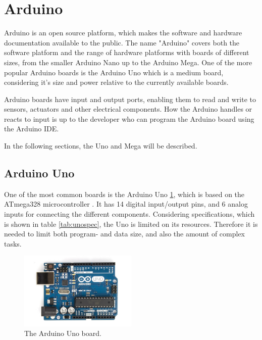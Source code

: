 \section{Arduino}\label{sec:arduino}
Arduino is an open source platform, which makes the software and hardware documentation available to the public. The name "Arduino" covers both the software platform and the range of hardware platforms with boards of different sizes, from the smaller Arduino Nano up to the Arduino Mega. One of the more popular Arduino boards is the Arduino Uno which is a medium board, considering it's size and power relative to the currently available boards.

Arduino boards have input and output ports, enabling them to read and write to sensors, actuators and other electrical components. How the Arduino handles or reacts to input is up to the developer who can program the Arduino board using the Arduino IDE.

In the following sections, the Uno and Mega will be described.

\subsection{Arduino Uno}
One of the most common boards is the Arduino Uno \ref{fig:arduinouno}, which is based on the ATmega328 microcontroller \cite{arduinouno}. It has 14 digital input/output pins, and 6 analog inputs for connecting the different components. Considering specifications, which is shown in table \ref{tab:unospec}, the Uno is limited on its resources. Therefore it is needed to limit both program- and data size, and also the amount of complex tasks.

\begin{figure}[h!]
\centering
\includegraphics[width=0.5\textwidth]{chapters/analysis/figs/ArduinoUno.jpg}
\caption{The Arduino Uno board\cite{arduinointroduction}.}
\label{fig:arduinouno}
\end{figure}

